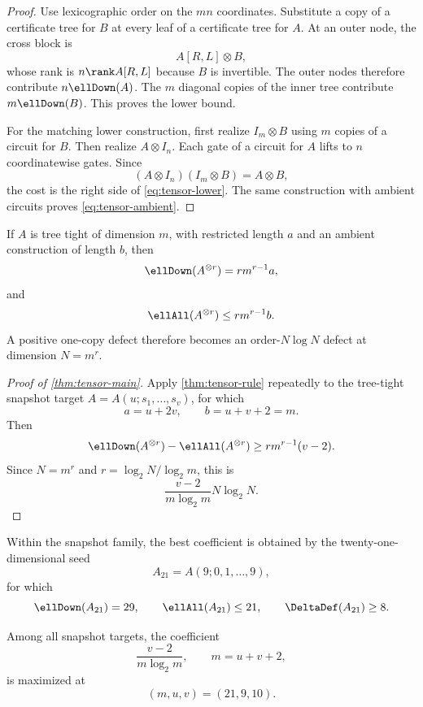 \begin{proof}
Use lexicographic order on the $mn$ coordinates.  Substitute a copy of a certificate tree for $B$ at every leaf of a certificate tree for $A$.  At an outer node, the cross block is
\[
A[R,L]\otimes B,
\]
whose rank is $n\rank A[R,L]$ because $B$ is invertible.  The outer nodes therefore contribute $n\ellDown(A)$.  The $m$ diagonal copies of the inner tree contribute $m\ellDown(B)$.  This proves the lower bound.

For the matching lower construction, first realize $I_m\otimes B$ using $m$ copies of a circuit for $B$.  Then realize $A\otimes I_n$.  Each gate of a circuit for $A$ lifts to $n$ coordinatewise gates.  Since
\[
(A\otimes I_n)(I_m\otimes B)=A\otimes B,
\]
the cost is the right side of \cref{eq:tensor-lower}.  The same construction with ambient circuits proves \cref{eq:tensor-ambient}.
\end{proof}

If $A$ is tree tight of dimension $m$, with restricted length $a$ and an ambient construction of length $b$, then
\begin{equation}\label{eq:tensor-power-lower}
\ellDown(A^{\otimes r})
=
r m^{r-1}a,
\end{equation}
and
\begin{equation}\label{eq:tensor-power-upper}
\ellAll(A^{\otimes r})
\le
r m^{r-1}b.
\end{equation}
A positive one-copy defect therefore becomes an order-$N\log N$ defect at dimension $N=m^r$.

\begin{proof}[Proof of \cref{thm:tensor-main}]
Apply \cref{thm:tensor-rule} repeatedly to the tree-tight snapshot target $A=A(u;s_1,\ldots,s_v)$, for which
\[
a=u+2v,
\qquad
b=u+v+2=m.
\]
Then
\[
\ellDown(A^{\otimes r})
-
\ellAll(A^{\otimes r})
\ge
r m^{r-1}(v-2).
\]
Since $N=m^r$ and $r=\log_2N/\log_2m$, this is
\[
\frac{v-2}{m\log_2m}N\log_2N.
\]
\end{proof}

Within the snapshot family, the best coefficient is obtained by the twenty-one-dimensional seed
\[
A_{21}=A(9;0,1,\ldots,9),
\]
for which
\[
\ellDown(A_{21})=29,
\qquad
\ellAll(A_{21})\le21,
\qquad
\DeltaDef(A_{21})\ge8.
\]

\begin{proposition}\label{prop:optimal-snapshot-seed}
Among all snapshot targets, the coefficient
\[
\frac{v-2}{m\log_2m},
\qquad m=u+v+2,
\]
is maximized at
\[
(m,u,v)=(21,9,10).
\]
\end{proposition}

